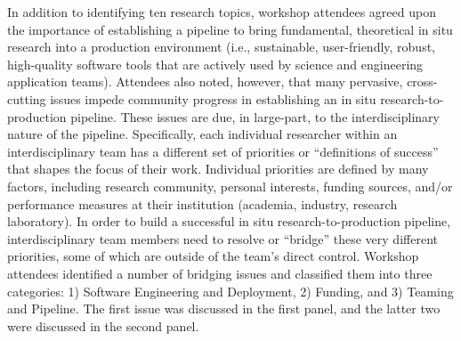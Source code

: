 In addition to identifying ten research topics, workshop attendees agreed upon the importance of establishing a pipeline to bring fundamental, theoretical in situ research into a production environment (i.e., sustainable, user-friendly, robust, high-quality software tools that are actively used by science and engineering application teams).  
%
Attendees also noted, however, that many pervasive, cross-cutting issues impede community progress in establishing an in situ research-to-production pipeline.  
%
These issues are due, in large-part, to the interdisciplinary nature of the pipeline. 
%
Specifically, each individual researcher within an interdisciplinary team has a different set of priorities or “definitions of success” that shapes the focus of their work.  
%
Individual priorities are defined by many factors, including research community, personal interests, funding sources, and/or performance measures at their institution (academia, industry, research laboratory).  
%
In order to build a successful in situ research-to-production pipeline,  interdisciplinary team members need to resolve or ``bridge'' these very different priorities, some of which are outside of the team’s direct control. Workshop attendees identified a number of bridging issues and classified them into three categories: 1) Software Engineering and Deployment, 2) Funding, and 3) Teaming and Pipeline.   
%
The first issue was discussed in the first panel, and the latter two were discussed in the second panel.
